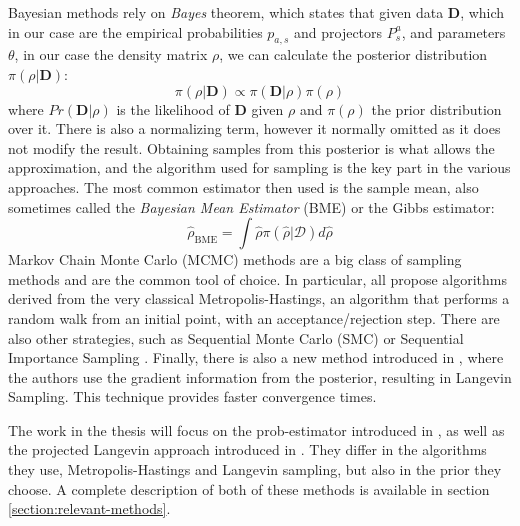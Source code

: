 \documentclass[12pt]{memoir}
\newcommand{\mb}{\mathbf}
\newcommand{\ti}{\textit}
\begin{document}
Bayesian methods rely on \ti{Bayes} theorem, which states that given data $\mb{D}$, which in our case are the empirical probabilities $p_{a,s}$ and projectors $P^a_s$, and parameters $\theta$, in our case the density matrix $\rho$, we can calculate the posterior distribution $\pi(\rho|\mb{D})$:
\begin{equation}
    \pi(\rho|\mb{D}) \propto \pi(\mb{D}|\rho) \pi(\rho)
\end{equation}
where $Pr(\mb{D}|\rho)$ is the likelihood of $\mb{D}$ given $\rho$ and $\pi(\rho)$ the prior distribution over it. There is also a normalizing term, however it normally omitted as it does not modify the result. Obtaining samples from this posterior is what allows the approximation, and the algorithm used for sampling is the key part in the various approaches. The most common estimator then used is the sample mean, also sometimes called the \ti{Bayesian Mean Estimator} (BME) or the Gibbs estimator:
\begin{equation}
    \hat \rho_{\text{BME}} = \int \hat \rho \pi(\hat \rho|\mathcal D) d\hat \rho
\end{equation}
Markov Chain Monte Carlo (MCMC) methods are a big class of sampling methods and are the common tool of choice. In particular, \cite{MA17,Mai22,LLJL20, meth:bayesian:mh:Blume-Kohout-2010} all propose algorithms derived from the very classical Metropolis-Hastings, an algorithm that performs a random walk from an initial point, with an acceptance/rejection step. There are also other strategies, such as Sequential Monte Carlo (SMC) \cite{meth:bayesian:smc:Ferrie-2014,meth:bayesian:smc:Kueng-2015} or Sequential Importance Sampling \cite{meth:bayesian:sis:Kravtsov-2013}. Finally, there is also a new method introduced in \cite{meth:bayesian:Langevin:ACMT2024}, where the authors use the gradient information from the posterior, resulting in Langevin Sampling. This technique provides faster convergence times.\medbreak

The work in the thesis will focus on the prob-estimator introduced in \cite{MA17}, as well as the projected Langevin approach introduced in \cite{meth:bayesian:Langevin:ACMT2024}. They differ in the algorithms they use, Metropolis-Hastings and Langevin sampling, but also in the prior they choose. A complete description of both of these methods is available in section \ref{section:relevant-methods}.

\end{document}
